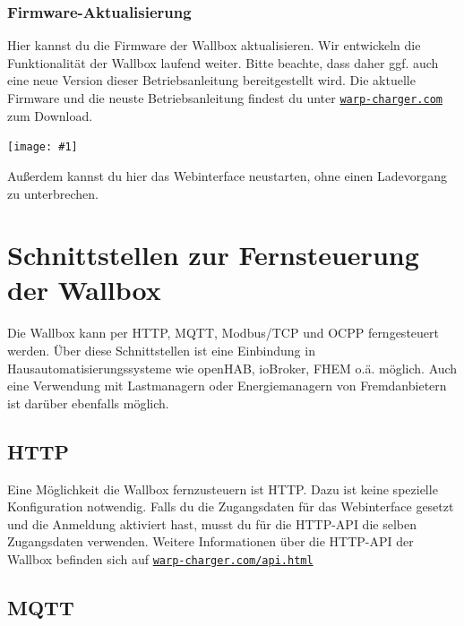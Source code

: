 \documentclass[a4paper,10pt]{article}
\newcommand{\gfx}[1]{\texttt{[image: \#1]}}
\newcommand\rurl[2]{%
  \href{#1}{\nolinkurl{#2}}%
}
\begin{document}
\begin{multicols*}{2}
    \subsubsection{Firmware-Aktualisierung}\label{firmware-update}
    Hier kannst du die Firmware der Wallbox aktualisieren. Wir entwickeln die Funktionalität
    der Wallbox laufend weiter. Bitte beachte, dass daher ggf. auch eine neue
    Version dieser Betriebsanleitung bereitgestellt wird.
    Die aktuelle Firmware und die neuste Betriebsanleitung findest du unter
    \rurl{https://warp-charger.com}{warp-charger.com} zum Download.

    \gfx{./img_warp2/resized/web_firmware_update}

    Außerdem kannst du hier das Webinterface neustarten, ohne einen Ladevorgang zu unterbrechen.

    \newpage

    \section{Schnittstellen zur Fernsteuerung der Wallbox}\label{interfaces}
    Die Wallbox kann per HTTP, MQTT, Modbus/TCP und OCPP ferngesteuert werden. Über diese Schnittstellen ist eine
    Einbindung in Hausautomatisierungssysteme wie openHAB, ioBroker, FHEM o.ä.
    möglich. Auch eine Verwendung mit Lastmanagern oder Energiemanagern von Fremdanbietern
    ist darüber ebenfalls möglich.

    \subsection{HTTP}\label{http-interface}
    Eine Möglichkeit die Wallbox fernzusteuern ist HTTP. Dazu ist keine
    spezielle Konfiguration notwendig. Falls du die Zugangsdaten für das Webinterface gesetzt und die Anmeldung aktiviert hast, musst du
    für die HTTP-API die selben Zugangsdaten verwenden.
    Weitere Informationen über die HTTP-API der Wallbox befinden sich auf \rurl{https://warp-charger.com/api.html}{warp-charger.com/api.html}


    \subsection{MQTT}\label{mqtt-interface}


\end{multicols*}
\end{document}
